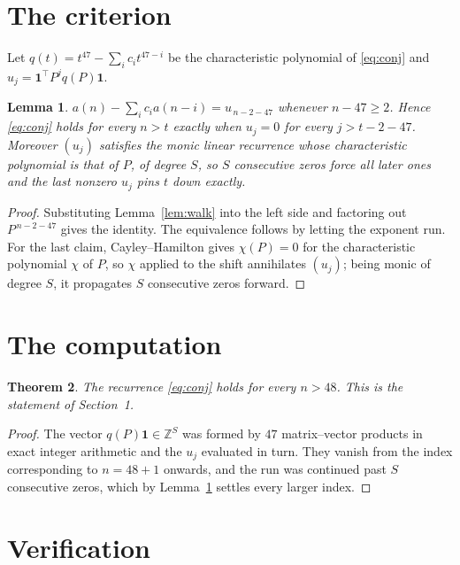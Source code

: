 \documentclass[11pt,a4paper]{article}
\theoremstyle{plain}
\newtheorem{theorem}{Theorem}
\newtheorem{lemma}[theorem]{Lemma}
\theoremstyle{definition}
\begin{document}
\section{The criterion}

Let $q(t)=t^{47}-\sum_i c_i t^{47-i}$ be the characteristic polynomial of
\eqref{eq:conj} and $u_j=\mathbf{1}^{\!\top}P^{j}q(P)\mathbf{1}$.

\begin{lemma}\label{lem:crit}
$a(n)-\sum_i c_i a(n-i)=u_{\,n-2-47}$ whenever $n-47\ge2$. Hence
\eqref{eq:conj} holds for every $n>t$ exactly when $u_j=0$ for every
$j>t-2-47$. Moreover $(u_j)$ satisfies the monic linear recurrence whose
characteristic polynomial is that of $P$, of degree $S$, so $S$ consecutive zeros force all
later ones and the last nonzero $u_j$ pins $t$ down exactly.
\end{lemma}

\begin{proof}
Substituting Lemma~\ref{lem:walk} into the left side and factoring out
$P^{\,n-2-47}$ gives the identity. The equivalence follows by letting the exponent
run. For the last claim, Cayley--Hamilton gives $\chi(P)=0$ for the characteristic
polynomial $\chi$ of $P$, so $\chi$ applied to the shift annihilates $(u_j)$; being monic of
degree $S$, it propagates $S$ consecutive zeros forward.
\end{proof}

\section{The computation}

\begin{theorem}
The recurrence \eqref{eq:conj} holds for every $n>48$. This is the statement of
Section~1.
\end{theorem}

\begin{proof}
The vector $q(P)\mathbf{1}\in\mathbb{Z}^{S}$ was formed by $47$ matrix--vector
products in exact integer arithmetic and the $u_j$ evaluated in turn. They vanish from the
index corresponding to $n=48+1$ onwards, and the run was continued past $S$ consecutive
zeros, which by Lemma~\ref{lem:crit} settles every larger index.
\end{proof}

\section{Verification}
\end{document}
